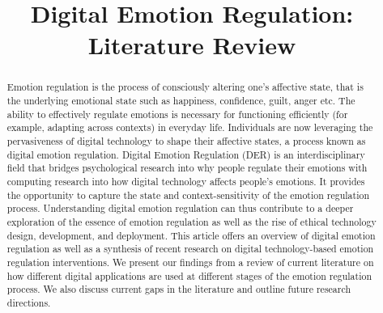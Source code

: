 \documentclass[lettersize,journal]{IEEEtran}
\begin{document}
\title{Digital Emotion Regulation: Literature Review}

\author{

}





\maketitle

\begin{abstract}
Emotion regulation is the process of consciously altering one's affective state, that is the underlying emotional state such as happiness, confidence, guilt, anger etc. The ability to effectively regulate emotions is necessary for functioning efficiently (for example, adapting across contexts) in everyday life. Individuals are now leveraging the pervasiveness of digital technology to shape their affective states, a process known as digital emotion regulation. Digital Emotion Regulation (DER) is an interdisciplinary field that bridges psychological research into why people regulate their emotions with computing research into how digital technology affects people's emotions. It provides the opportunity to capture the state and context-sensitivity of the emotion regulation process. Understanding digital emotion regulation can thus contribute to a deeper exploration of the essence of emotion regulation as well as the rise of ethical technology design, development, and deployment. This article offers an overview of digital emotion regulation as well as a synthesis of recent research on digital technology-based emotion regulation interventions. We present our findings from a review of current literature on how different digital applications are used at different stages of the emotion regulation process. We also discuss current gaps in the literature and outline future research directions.
\end{abstract}
\end{document}
